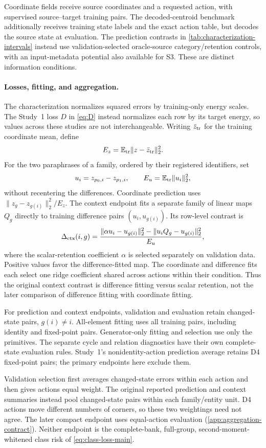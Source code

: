 Coordinate fields receive source coordinates and a requested
action, with supervised source--target training pairs.
The decoded-centroid benchmark additionally receives training
state labels and the exact action table, but decodes the
source state at evaluation.
The prediction contrasts in
\cref{tab:characterization-intervals} instead use
validation-selected oracle-source category/retention controls,
with an input-metadata potential also available for S3.
These are distinct information conditions.

\paragraph{Losses, fitting, and aggregation.}
The characterization normalizes squared errors by training-only
energy scales.
The Study~1 loss $D$ in \cref{eq:D} instead normalizes each row
by its target energy, so values across these studies are not
interchangeable.
Writing $\bar z_{\rm tr}$ for the training coordinate mean,
define
\[
 E_z=\mathbb E_{\rm tr}\|z-\bar z_{\rm tr}\|_2^2.
\]
For the two paraphrases of a family, ordered by their
registered identifiers, set
\[
 u_i=z_{p_0,i}-z_{p_1,i},
 \qquad E_u=\mathbb E_{\rm tr}\|u_i\|_2^2,
\]
without recentering the differences.
Coordinate prediction uses
$\|\widehat z_g-z_{g(i)}\|_2^2/E_z$.
The context endpoint fits a separate family of linear maps
$Q_g$ directly to training difference pairs $(u_i,u_{g(i)})$.
Its row-level contrast is
\[
 \Delta_{\rm ctx}(i,g)
 =
 \frac{\|\alpha u_i-u_{g(i)}\|_2^2
       -\|u_iQ_g-u_{g(i)}\|_2^2}{E_u},
\]
where the scalar-retention coefficient $\alpha$ is selected
separately on validation data.
Positive values favor the difference-fitted map.
The coordinate and difference fits each select one ridge
coefficient shared across actions within their condition.
Thus the original context contrast is difference fitting
versus scalar retention, not the later comparison of
difference fitting with coordinate fitting.

For prediction and context endpoints, validation and evaluation
retain changed-state pairs, $g(i)\ne i$.
All-element fitting uses all training pairs, including
identity and fixed-point pairs.
Generator-only fitting and selection use only the primitives.
The separate cycle and relation diagnostics have their own
complete-state evaluation rules.
Study~1's nonidentity-action prediction average retains D4
fixed-point pairs; the primary endpoints here exclude them.

Validation selection first averages changed-state errors
within each action and then gives actions equal weight.
The original reported prediction and context summaries
instead pool changed-state pairs within each family/entity
unit.
D4 actions move different numbers of corners, so these two
weightings need not agree.
The later compact endpoint uses equal-action evaluation
(\cref{app:aggregation-contract}).
Neither endpoint is the complete-bank, full-group,
second-moment-whitened class risk of
\cref{eq:class-loss-main}.

